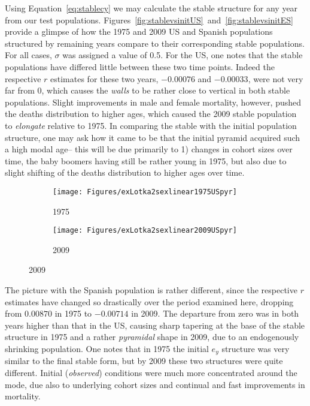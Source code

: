  \FloatBarrier

Using Equation~\eqref{eq:stablecy} we may calculate the
stable structure for any year from our test populations.
Figures~\ref{fig:stablevsinitUS}~and~\ref{fig:stablevsinitES} provide a glimpse
of how the 1975 and 2009 US and Spanish populations structured by remaining
years compare to their corresponding stable populations. For all cases,
$\sigma$ was assigned a value of 0.5. For the US, one notes that the stable
populations have differed little between these two time points. Indeed the
respective $r$ estimates for these two years, $-0.00076$ and $-0.00033$, were 
not very far from 0, which causes the \textit{walls} to be rather close to vertical in both
stable populations. Slight improvements in male and female mortality, however,
pushed the deaths distribution to higher ages, which caused the 2009 stable
population to \textit{elongate} relative to 1975. In comparing the stable with the initial
population structure, one may ask how it came to be that the initial pyramid
acquired such a high modal age-- this will be due primarily to 1) changes in
cohort sizes over time, the baby boomers having still be rather young in 1975,
but also due to slight shifting of the deaths distribution to higher ages over
time.
 
\begin{figure}[!ht]
   \caption{US, stable ($\sigma = 0.05$) versus initial $e_y$-structures, 1975
   and 2009}
   \label{fig:stablevsinitUS}
        \centering
        \begin{subfigure}
                \centering
                \caption*{1975}
                \texttt{[image: Figures/exLotka2sexlinear1975USpyr]}
        \end{subfigure}
        \begin{subfigure}
                \centering
                \caption*{2009}
                \texttt{[image: Figures/exLotka2sexlinear2009USpyr]}
        \end{subfigure}
\end{figure}
 
The picture with the Spanish population is rather different, since the
respective $r$ estimates have changed so drastically over the period examined
here, dropping from $0.00870$ in 1975 to $-0.00714$ in 2009. The departure from
zero was in both years higher than that in the US, causing sharp tapering at the
base of the stable structure in 1975 and a rather \textit{pyramidal} shape in
2009, due to an endogenously shrinking population. One notes that in 1975 the
initial $e_y$ structure was very similar to the final stable form, but by 2009
these two structures were quite different. Initial (\textit{observed})
conditions were much more concentrated around the mode, due also to underlying
cohort sizes and continual and fast improvements in mortality.
 
